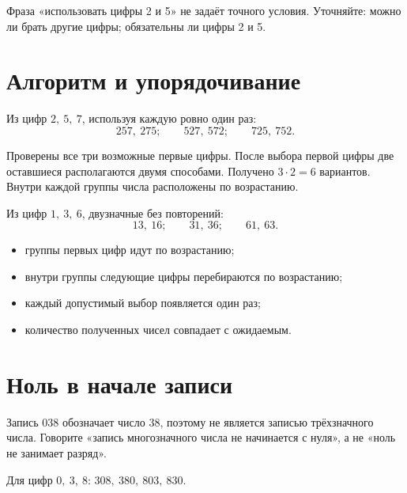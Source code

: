 \begin{teacherbox}
  Фраза «использовать цифры 2 и 5» не задаёт точного условия. Уточняйте:
  можно ли брать другие цифры; обязательны ли цифры 2 и 5.
\end{teacherbox}

\newpage
\section{Алгоритм и упорядочивание}

Из цифр \(2,\ 5,\ 7\), используя каждую ровно один раз:
\[
  257,\ 275;\qquad 527,\ 572;\qquad 725,\ 752.
\]

\begin{teacherbox}
  Проверены все три возможные первые цифры. После выбора первой цифры две
  оставшиеся располагаются двумя способами. Получено \(3\cdot2=6\) вариантов.
  Внутри каждой группы числа расположены по возрастанию.
\end{teacherbox}

Из цифр \(1,\ 3,\ 6\), двузначные без повторений:
\[
  13,\ 16;\qquad 31,\ 36;\qquad 61,\ 63.
\]

\begin{teacherbox}
  \begin{itemize}
    \item группы первых цифр идут по возрастанию;
    \item внутри группы следующие цифры перебираются по возрастанию;
    \item каждый допустимый выбор появляется один раз;
    \item количество полученных чисел совпадает с ожидаемым.
  \end{itemize}
\end{teacherbox}

\section{Ноль в начале записи}

\begin{teacherbox}
  Запись \(038\) обозначает число \(38\), поэтому не является записью
  трёхзначного числа. Говорите «запись многозначного числа не начинается с
  нуля», а не «ноль не занимает разряд».
\end{teacherbox}

Для цифр \(0,\ 3,\ 8\): \(308,\ 380,\ 803,\ 830\).

